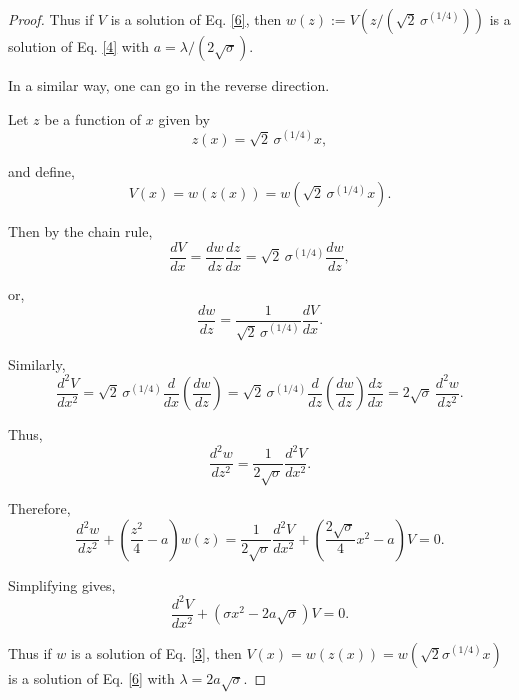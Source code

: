 \documentclass{article}
\numberwithin{equation}{section}
\begin{document}
{\begin{proof}
Thus if $V$ is a solution of Eq. \eqref{6}, then $w(z):= V\!\left(z/(\sqrt{2}\,\sigma^{(1/4)})\right)$ is a solution of Eq. \eqref{4} with $a=\lambda/(2\sqrt{\sigma})$.

In a similar way, one can go in the reverse direction.

Let $z$ be a function of $x$ given by
\begin{equation}
z(x)=\sqrt{2}\,\sigma^{(1/4)}x,\label{15}
\end{equation}

and define,
\begin{equation}
V(x)=w(z(x))=w(\sqrt{2}\,\sigma^{(1/4)}x).\label{16}
\end{equation}

Then by the chain rule,
\begin{equation}
\frac{dV}{dx}=\frac{dw}{dz}\frac{dz}{dx}=\sqrt{2}\,\sigma^{(1/4)}\frac{dw}{dz},\label{17}
\end{equation}

or,
\begin{equation}
\frac{dw}{dz}=\frac{1}{\sqrt{2}\,\sigma^{(1/4)}}\frac{dV}{dx}.\label{18}
\end{equation}

Similarly,
\begin{equation}
\frac{d^2V}{dx^2}=\sqrt{2}\,\sigma^{(1/4)}\frac{d}{dx}\left(\frac{dw}{dz}\right)=\sqrt{2}\,\sigma^{(1/4)}\frac{d}{dz}\left(\frac{dw}{dz}\right)\frac{dz}{dx}= 2\sqrt{\sigma}\,\frac{d^2w}{dz^2}.\label{19}
\end{equation}

Thus,
\begin{equation}
\frac{d^2w}{dz^2}=\frac{1}{2\sqrt{\sigma}}\frac{d^2V}{dx^2}.\label{20}
\end{equation}

Therefore,
\begin{equation}
\frac{d^2 w}{dz^2}+\left(\frac{z^2}{4}-a\right)w(z)=\frac{1}{2\sqrt{\sigma}}\frac{d^2V}{dx^2}+\left(\frac{2\sqrt{\sigma}}{4}x^2 -a\right)\!V=0.\label{21}
\end{equation}

Simplifying gives,
\begin{equation}
\frac{d^2 V}{dx^2}+ (\sigma x^2 - 2a\sqrt{\sigma})V=0.\label{22}
\end{equation}

Thus if $w$ is a solution of Eq. \eqref{3}, then $V(x)= w(z(x))=w(\sqrt{2}\sigma^{(1/4)}x)$ is a solution of Eq. \eqref{6} with $\lambda=2a\sqrt{\sigma}$.
\end{proof}

}
\end{document}
